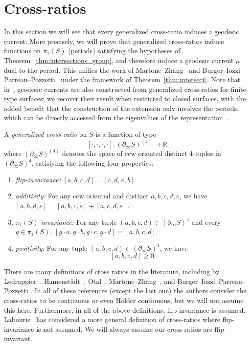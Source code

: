 \section{Cross-ratios}
\label{sec:crossratios}

In this section we will see that every generalized cross-ratio induces
a geodesic current. More precisely, we will prove that generalized
cross-ratios induce functions on $\pi_1(S)$ (periods) satisfying the
hypotheses of Theorem~\ref{thm:intersections_group}, and therefore
induce a geodesic current $\mu$ dual to the period. This unifies the
work of Martone--Zhang~\cite{MZ19:PositivelyRatioed} and
Burger--Iozzi--Parreau--Pozzetti~\cite{BIPP24:PositiveCrossratios}
under the framework of Theorem~\ref{thm:intersect}. Note that
in~\cite{BIPP24:PositiveCrossratios}, geodesic currents are also
constructed from generalized cross-ratios for finite-type surfaces; we
recover their result when restricted to closed surfaces, with the
added benefit that the construction of the extension only involves the
periods, which can be directly accessed from the eigenvalues of the
representation~\cite[Theorem~1.1]{MZ19:PositivelyRatioed}.

\begin{definition}
A \emph{generalized cross-ratio} on $S$ is a function of type
\[
[\cdot, \cdot, \cdot, \cdot] \colon (\partial_{\infty} S)^{(4)} \to \mathbb{R}
\]
where $(\partial_{\infty} S)^{(4)}$ denotes the space of ccw oriented distinct 4-tuples in $(\partial_{\infty} S)^{4}$, satisfying the following four properties:
\begin{enumerate}
\item \emph{flip-invariance:} $[a,b,c,d]=[c,d,a, b].$
\item \emph{additivity:} For any ccw oriented and distinct $a,b,c,d,e$, we have
$[a,b, d, e]=[a,b,c,e] + [a,c,d, e]$.
\item \emph{$\pi_1(S)$-invariance:} For any tuple $(a,b,c,d) \in (\partial_{\infty} S)^{4}$ and every $g \in \pi_1(S)$, $[g \cdot a, g \cdot b, g \cdot c, g \cdot d] = [a,b,c,d]$.
\item \emph{positivity:}  For any tuple $(a,b,c,d) \in (\partial_{\infty} S)^{4}$, we have
\[
[a,b,c,d] \geq 0.
\]
\end{enumerate}
\label{def:general_crossratio}
\end{definition}

There are many definitions of cross ratios in the literature,
including by Ledrappier~\cite{L95:BordDesVar},
Hamenst\"adt~\cite{Ham99:Cocycles}, Otal~\cite{Ot92:Symplectique},
Martone--Zhang~\cite{MZ19:PositivelyRatioed}, and
Burger--Iozzi--Parreau--Pozzetti \cite{BIPP24:PositiveCrossratios}.
In all of these references (except the last one) the authors consider the cross-ratios to be continuous or even H\"older continuous, but we will not assume this here. Furthermore, in all of the above definitions, flip-invariance is assumed.
Labourie~\cite[Definition~3.1]{L07:Crossratio} has considered a more general definition of cross-ratios where flip-invariance is not assumed.  We will always assume our cross-ratios are flip-invariant.

